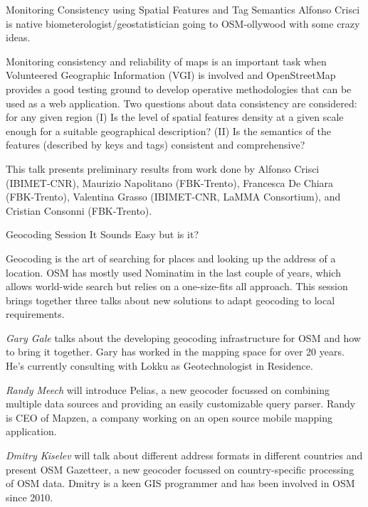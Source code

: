 %
{Monitoring Consistency using Spatial Features and Tag Semantics}%
{Alfonso Crisci is native biometerologist/geostatistician going to OSM-ollywood with some crazy ideas.}%
{Monitoring consistency and reliability of maps is an important task when Volunteered Geographic Information (VGI) is involved and OpenStreetMap provides a good testing ground to develop operative methodologies that can be used as a web application. Two questions about data consistency are considered: for any given region (I) Is the level of spatial features density at a given scale enough for a suitable geographical description? (II) Is the semantics of the features (described by keys and tags) consistent and comprehensive?

This talk presents preliminary results from work done by Alfonso Crisci (IBIMET-CNR), Maurizio Napolitano (FBK-Trento), Francesca De Chiara (FBK-Trento), Valentina Grasso (IBIMET-CNR, LaMMA Consortium), and Cristian Consonni (FBK-Trento).}

%
{Geocoding Session}%
{It Sounds Easy but is it?}%
{}%
{Geocoding is the art of searching for places and looking up
the address of a location.
OSM has mostly used Nominatim in the last couple of years, which
allows world-wide search but relies on a one-size-fits all approach.
This session brings together three talks about new solutions to
adapt geocoding to local requirements.

\textit{Gary Gale} talks about the developing geocoding infrastructure for
OSM and how to bring it together. Gary has worked in the mapping
space for over 20 years. He's currently consulting with Lokku as
Geotechnologist in Residence.

\textit{Randy Meech} will introduce Pelias, a new geocoder focussed
on combining multiple data sources and providing an easily customizable
query parser. Randy is CEO of Mapzen, a company working on an open source
mobile mapping application.

\textit{Dmitry Kiselev} will talk about different address formats in different
countries and present OSM Gazetteer, a new geocoder focussed on
country-specific processing of OSM data. Dmitry is a keen GIS programmer
and has been involved in OSM since 2010.
}

